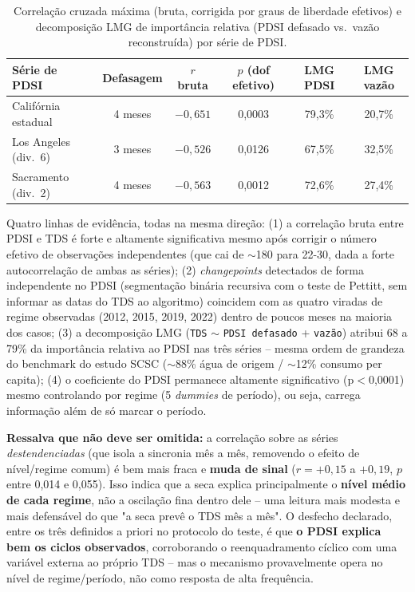 \begin{table}[H]
    \centering
    \small
    \begin{tabular}{l|c|c|c|c|c}
         Série de PDSI & Defasagem & $r$ bruta & $p$ (dof efetivo) & LMG PDSI & LMG vazão \\ \hline
        Califórnia estadual & 4 meses & $-0{,}651$ & 0,0003 & 79,3\% & 20,7\% \\
        Los Angeles (div.\ 6) & 3 meses & $-0{,}526$ & 0,0126 & 67,5\% & 32,5\% \\
        Sacramento (div.\ 2) & 4 meses & $-0{,}563$ & 0,0012 & 72,6\% & 27,4\% \\
    \end{tabular}
    \caption{Correlação cruzada máxima (bruta, corrigida por graus de liberdade efetivos) e decomposição LMG de importância relativa (PDSI defasado vs.\ vazão reconstruída) por série de PDSI.}
    \label{tab:pdsi-resultados}
\end{table}

Quatro linhas de evidência, todas na mesma direção: (1) a correlação bruta entre PDSI e TDS é forte e altamente significativa mesmo após corrigir o número efetivo de observações independentes (que cai de $\sim$180 para 22-30, dada a forte autocorrelação de ambas as séries); (2) \textit{changepoints} detectados de forma independente no PDSI (segmentação binária recursiva com o teste de Pettitt, sem informar as datas do TDS ao algoritmo) coincidem com as quatro viradas de regime observadas (2012, 2015, 2019, 2022) dentro de poucos meses na maioria dos casos; (3) a decomposição LMG (\texttt{TDS} $\sim$ \texttt{PDSI defasado} + \texttt{vazão}) atribui 68 a 79\% da importância relativa ao PDSI nas três séries -- mesma ordem de grandeza do benchmark do estudo SCSC ($\sim$88\% água de origem / $\sim$12\% consumo per capita); (4) o coeficiente do PDSI permanece altamente significativo (p$<$0,0001) mesmo controlando por regime (5 \textit{dummies} de período), ou seja, carrega informação além de só marcar o período.

\textbf{Ressalva que não deve ser omitida:} a correlação sobre as séries \textit{destendenciadas} (que isola a sincronia mês a mês, removendo o efeito de nível/regime comum) é bem mais fraca e \textbf{muda de sinal} ($r=+0{,}15$ a $+0{,}19$, $p$ entre 0,014 e 0,055). Isso indica que a seca explica principalmente o \textbf{nível médio de cada regime}, não a oscilação fina dentro dele -- uma leitura mais modesta e mais defensável do que "a seca prevê o TDS mês a mês". O desfecho declarado, entre os três definidos a priori no protocolo do teste, é que \textbf{o PDSI explica bem os ciclos observados}, corroborando o reenquadramento cíclico com uma variável externa ao próprio TDS -- mas o mecanismo provavelmente opera no nível de regime/período, não como resposta de alta frequência.

